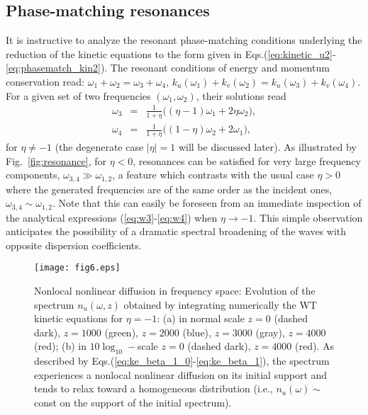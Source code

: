 \documentclass[pra,twocolumn,showpacs,preprintnumbers,amsmath,amssymb]{revtex4}
\begin{document}
\subsection{Phase-matching resonances}
\label{sec:phasematch}

It is instructive to analyze the resonant phase-matching conditions underlying the reduction of the kinetic equations to the form given in Eqs.(\ref{eq:kinetic_u2}-\ref{eq:phasematch_kin2}).
The resonant conditions of energy and momentum conservation read: $\omega_1+\omega_2=\omega_3+\omega_4$, $ k_u(\omega_1)+ k_v(\omega_2) = k_u(\omega_3)+ k_v(\omega_4)$. 
For a given set of two frequencies $(\omega_1, \omega_2)$, their solutions read
\begin{eqnarray}
\omega_3 &=& \frac{1}{1+\eta} \big( (\eta-1) \omega_1 + 2 \eta \omega_2 \big), 
\label{eq:w3}\\
\omega_4 &=& \frac{1}{1+\eta} \big( (1-\eta) \omega_2 + 2 \omega_1 \big),
\label{eq:w4}
\end{eqnarray}
for $\eta \neq -1$ (the degenerate case $|\eta|=1$ will be discussed later).
As  illustrated by Fig.~\ref{fig:resonance}, for $\eta <0$, resonances can be satisfied for very large frequency components, $\omega_{3,4} \gg \omega_{1,2}$, a feature which contrasts with the usual case $\eta > 0$ where the generated frequencies are of the same order as the incident ones, $\omega_{3,4} \sim \omega_{1,2}$.
Note that this can easily be foreseen from an immediate inspection of the analytical expressions (\ref{eq:w3}-\ref{eq:w4}) when $\eta \to -1$.
This simple observation anticipates the possibility of a dramatic spectral broadening of the waves with opposite dispersion coefficients.


\begin{center}
\begin{figure}[t]
\texttt{[image: fig6.eps]}
\caption{Nonlocal nonlinear diffusion in frequency space:
Evolution of the spectrum $n_u(\omega,z)$ obtained by integrating numerically the WT kinetic equations for $\eta=-1$: (a) in normal scale $z=0$ (dashed dark), $z=1000$ (green), $z=2000$ (blue), $z=3000$ (gray), $z=4000$ (red); (b) in $10 \log_{10}-$scale $z=0$ (dashed dark), $z=4000$ (red).
As described by Eqs.(\ref{eq:ke_beta_1_0}-\ref{eq:ke_beta_1}), the spectrum experiences a nonlocal nonlinear diffusion on its initial support and tends to relax toward a homogeneous distribution (i.e., $n_u(\omega) \sim $const on the support of the initial spectrum).
}
\label{fig:nonloc_diff}
\end{figure}
\end{center}
\end{document}
